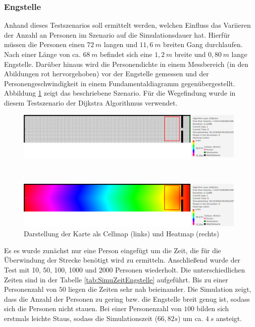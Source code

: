\subsubsection{Engstelle}
Anhand dieses Testszenarios soll ermittelt werden, welchen Einfluss das Variieren der Anzahl an Personen im Szenario auf die Simulationsdauer hat. Hierfür müssen die Personen einen $72\ m$ langen und $11,6\ m$ breiten Gang durchlaufen. Nach einer Länge von ca. $68\ m$ befindet sich eine $1,2\ m$ breite und $0,80\ m$ lange Engstelle.
Darüber hinaus wird die Personendichte in einem Messbereich (in den Abildungen rot hervorgehoben) vor der Engstelle gemessen und der Personengeschwindigkeit in einem Fundamentaldiagramm gegenübergestellt. Abbildung \ref{fig:engstelleMAP} zeigt das beschriebene Szenario. Für die Wegefindung wurde in diesem Testszenario der Dijkstra Algorithmus verwendet. 

\begin{figure}
\centering
\begin{minipage}{1\textwidth}
\centering
  \includegraphics[width=1\linewidth]{abbildungen/engstelle/engstelleMAP.png}
\end{minipage}%
\\
\begin{minipage}{1\textwidth}
\centering
  \includegraphics[width=1\linewidth]{abbildungen/engstelle/engstelleHEATMAP.png}
\end{minipage}
\caption{Darstellung der Karte als Cellmap (links) und Heatmap (rechts)}
\label{fig:engstelleMAP}
\end{figure}

Es es wurde zunächst nur eine Person eingefügt um die Zeit, die für die Überwindung der Strecke benötigt wird zu ermitteln. Anschließend wurde der Test mit 10, 50, 100, 1000 und 2000 Personen wiederholt. Die unterschiedlichen Zeiten sind in der Tabelle \ref{tab:SimuZeitEngstelle} aufgeführt. Bis zu einer Personenzahl von $50$ liegen die Zeiten sehr nah beieinander. Die Simulation zeigt, dass die Anzahl der Personen zu gering bzw. die Engstelle breit genug ist, sodass sich die Personen nicht stauen. Bei einer Personenzahl von $100$ bilden sich erstmals leichte Staus, sodass die Simulationszeit ($66,82 s$) um ca. $4\ s$ ansteigt.\\

